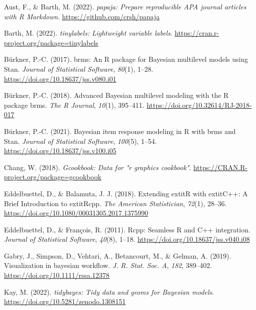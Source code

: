 \documentclass[
  man]{apa7}
\newlength{\cslhangindent}
\newlength{\cslentryspacingunit} %
\newenvironment{CSLReferences}[2] %
 {%
  \setlength{\parindent}{0pt}
  \ifodd #1
  \let\oldpar\par
  \def\par{\hangindent=\cslhangindent\oldpar}
  \fi
  \setlength{\parskip}{#2\cslentryspacingunit}
 }%
 {}
\begin{document}
\hypertarget{refs}{}
\begin{CSLReferences}{1}{0}
\leavevmode{}%
Aust, F., \& Barth, M. (2022). \emph{{papaja}: {Prepare} reproducible {APA} journal articles with {R Markdown}}. \url{https://github.com/crsh/papaja}

\leavevmode{}%
Barth, M. (2022). \emph{{tinylabels}: Lightweight variable labels}. \url{https://cran.r-project.org/package=tinylabels}

\leavevmode{}%
Bürkner, P.-C. (2017). {brms}: An {R} package for {Bayesian} multilevel models using {Stan}. \emph{Journal of Statistical Software}, \emph{80}(1), 1--28. \url{https://doi.org/10.18637/jss.v080.i01}

\leavevmode{}%
Bürkner, P.-C. (2018). Advanced {Bayesian} multilevel modeling with the {R} package {brms}. \emph{The R Journal}, \emph{10}(1), 395--411. \url{https://doi.org/10.32614/RJ-2018-017}

\leavevmode{}%
Bürkner, P.-C. (2021). Bayesian item response modeling in {R} with {brms} and {Stan}. \emph{Journal of Statistical Software}, \emph{100}(5), 1--54. \url{https://doi.org/10.18637/jss.v100.i05}

\leavevmode{}%
Chang, W. (2018). \emph{Gcookbook: Data for "r graphics cookbook"}. \url{https://CRAN.R-project.org/package=gcookbook}

\leavevmode{}%
Eddelbuettel, D., \& Balamuta, J. J. (2018). {Extending extit{R} with extit{C++}: A Brief Introduction to extit{Rcpp}}. \emph{The American Statistician}, \emph{72}(1), 28--36. \url{https://doi.org/10.1080/00031305.2017.1375990}

\leavevmode{}%
Eddelbuettel, D., \& François, R. (2011). {Rcpp}: Seamless {R} and {C++} integration. \emph{Journal of Statistical Software}, \emph{40}(8), 1--18. \url{https://doi.org/10.18637/jss.v040.i08}

\leavevmode{}%
Gabry, J., Simpson, D., Vehtari, A., Betancourt, M., \& Gelman, A. (2019). Visualization in bayesian workflow. \emph{J. R. Stat. Soc. A}, \emph{182}, 389--402. \url{https://doi.org/10.1111/rssa.12378}

\leavevmode{}%
Kay, M. (2022). \emph{{tidybayes}: Tidy data and geoms for {Bayesian} models}. \url{https://doi.org/10.5281/zenodo.1308151}


\end{CSLReferences}
\end{document}
